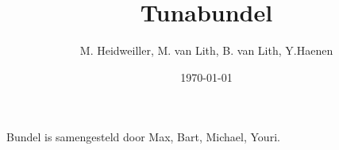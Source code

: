 \documentclass[11pt,a4paper,twoside]{article}
\title{Tunabundel}
\author{M. Heidweiller, M. van Lith, B. van Lith, Y.Haenen}
\date{\today}
\begin{document}
\noindent




\renewcommand\contentsname{List of awesomeness.}
\tableofcontents
{}
\vfill
Bundel is samengesteld door Max, Bart, Michael, Youri.
\clearpage

\raggedright










  


 









\end{document}
